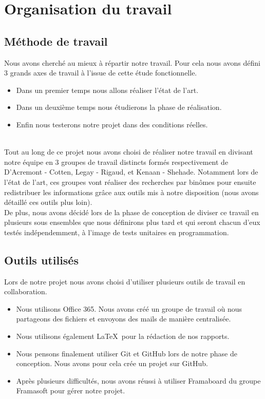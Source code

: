 
\chapter{Organisation du travail}


\section{Méthode de travail}

Nous avons cherché au mieux à répartir notre travail. Pour cela nous avons défini 3 grands axes de travail à l'issue de cette étude fonctionnelle.
\begin{itemize}
\item Dans un premier temps nous allons réaliser l'état de l'art.
\item Dans un deuxième temps nous étudierons la phase de réalisation.
\item Enfin nous testerons notre projet dans des conditions réelles.
\end{itemize}
~\\

Tout au long de ce projet nous avons choisi de réaliser notre travail en divisant notre équipe en 3 groupes de travail distincts formés respectivement de D'Acremont - Cotten, Legay - Rigaud, et Kenaan - Shehade. Notamment lors de l'état de l'art, ces groupes vont réaliser des recherches par binômes pour ensuite redistribuer les informations grâce aux outils mis à notre disposition (nous avons détaillé ces outils plus loin).
~\\

De plus, nous avons décidé lors de la phase de conception de diviser ce travail en plusieurs sous ensembles que nous définirons plus tard et qui seront chacun d'eux testés indépendemment, à l'image de tests unitaires en programmation.



\section{Outils utilisés}

Lors de notre projet nous avons choisi d'utiliser plusieurs outils de travail en collaboration.

\begin{itemize}
\item Nous utilisons Office 365. Nous avons créé un groupe de travail où nous partageons des fichiers et envoyons des mails de manière centralisée.
\item Nous utilisons également \LaTeX~pour la rédaction de nos rapports.
\item Nous pensons finalement utiliser Git et GitHub lors de notre phase de conception. Nous avons pour cela crée un projet sur GitHub.
\item Après plusieurs difficultés, nous avons réussi à utiliser Framaboard du groupe Framasoft pour gérer notre projet.
\end{itemize}








  


